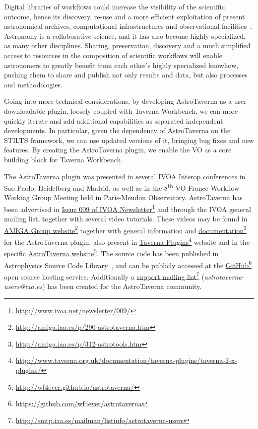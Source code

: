 \documentclass[final,authoryear,5p,times,twocolumn]{elsarticle}
\newcommand{\urlsamefont}[1]{\urlstyle{same}\url{#1}}
\newcommand{\hrefnote}[2]{\href{#1}{#2}\footnote{\urlsamefont{#1}}}
\begin{document}
Digital libraries of workflows could increase the visibility of the scientific outcome, hence its discovery, re-use and a more efficient exploitation of present astronomical archives, computational infrastructures and observational facilities~\citep{Ruiz2012}. Astronomy is a collaborative science, and it has also become highly specialized, as many other disciplines. Sharing, preservation, discovery and a much simplified access to resources in the composition of scientific workflows will enable astronomers to greatly benefit from each other’s highly specialized knowhow, pushing them to share and publish not only results and data, but also processes and methodologies.

Going into more technical considerations, by developing AstroTaverna as a user downloadable plugin, loosely coupled with Taverna Workbench, we can more quickly iterate and add additional capabilities as separated independent developments. In particular, given the dependency of AstroTaverna on the STILTS framework, we can use updated versions of it, bringing bug fixes and new features. By creating the AstroTaverna plugin, we enable the VO as a core building block for Taverna Workbench.

The AstroTaverna plugin was presented in several IVOA Interop conferences in Sao Paolo, Heidelberg and Madrid, as well as in the 8\textsuperscript{th} VO France Workflow Working Group Meeting held in Paris-Meudon Observatory. AstroTaverna has been advertised in \hrefnote{http://www.ivoa.net/newsletter/009/}{Issue 009 of IVOA Newsletter} and through the IVOA general mailing list, together with several video tutorials. These videos may be found in \hrefnote{http://amiga.iaa.es/p/290-astrotaverna.htm}{AMIGA Group website} together with general information and \hrefnote{http://amiga.iaa.es/p/312-astrotools.htm}{documentation} for the AstroTaverna plugin, also present in \hrefnote{http://www.taverna.org.uk/documentation/taverna-plugins/taverna-2-x-plugins/}{Taverna Plugins} website and in the specific \hrefnote{http://wf4ever.github.io/astrotaverna/}{\label{website}AstroTaverna website}. The source code has been published in Astrophysics Source Code Library~\citep[ASCL; see][]{Garrido2013}, and can be publicly accessed at the \hrefnote{https://github.com/wf4ever/astrotaverna}{\label{astrotavgit}GitHub} open source hosting service. Additionally a \hrefnote{http://smtp.iaa.es/mailman/listinfo/astrotaverna-users}{support mailing list} (\textit{astrotaverna-users@iaa.es}) has been created for the AstroTaverna community. 
\end{document}
